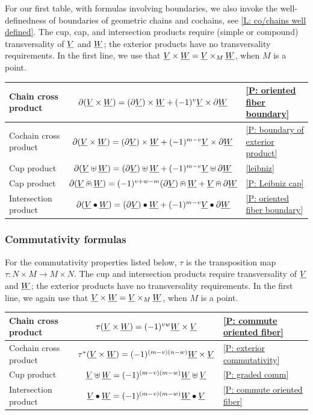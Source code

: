 For our first table, with formulas involving boundaries, we also invoke the well-definedness of boundaries of geometric chains and cochains, see \cref{L: co/chains well defined}.
The cup, cap, and intersection products require (simple or compound) transversality of $\underline{V}$ and $\underline{W}$; the exterior products have no transversality requirements.
In the first line, we use that $\underline{V} \times \underline{W} = \underline{V} \times_M \underline{W}$, when $M$ is a point.

\begin{center}
	\begin{tabular}{|l|c|l|}
		\hline
		Chain cross product &$\partial(\underline{V} \times \underline{W}) = (\partial \underline{V}) \times \underline{W}+ (-1)^{v}\underline{V} \times \partial \underline{W}$&\cref{P: oriented fiber boundary}\\
		\hline
		Cochain cross product&$\partial(\underline{V} \times \underline{W}) = (\partial \underline{V}) \times \underline{W}+ (-1)^{m-v}\underline{V} \times \partial \underline{W}$&\cref{P: boundary of exterior product}\\
		\hline
		Cup product&$\partial (\underline{V} \uplus \underline{W}) = (\partial \underline{V}) \uplus \underline{W}+ (-1)^{m-v} \underline{V} \uplus \partial \underline{W}$&\cref{leibniz}\\
		\hline
		Cap product&$\partial(\underline{V}\nplus \underline{W}) = (-1)^{v+w-m} (\partial \underline{V})\nplus \underline{W} + \underline{V}\nplus\partial \underline{W}$&\cref{P: Leibniz cap}\\
		\hline
		Intersection product &$\partial (\underline{V} \bullet \underline{W}) = (\partial \underline{V}) \bullet \underline{W} + (-1)^{m-v}\underline{V} \bullet \partial \underline{W}$&\cref{P: oriented fiber boundary}\\
		\hline
	\end{tabular}
\end{center}

\subsubsection{Commutativity formulas}

For the commutativity properties listed below, $\tau$ is the transposition map $\tau \colon N \times M \to M \times N$.
The cup and intersection products require transversality of $\underline{V}$ and $\underline{W}$; the exterior products have no transversality requirements.
In the first line, we again use that $\underline{V} \times \underline{W} = \underline{V} \times_M \underline{W}$, when $M$ is a point.

\begin{center}
	\begin{tabular}{|l|c|l|}
		\hline
		Chain cross product&$\tau(\underline{V} \times \underline{W}) = (-1)^{vw}\underline{W} \times \underline{V}$&\cref{P: commute oriented fiber}\\
		\hline
		Cochain cross product&$\tau^*(\underline{V} \times \underline{W}) = (-1)^{(m-v)(n-w)}\underline{W} \times \underline{V}$&\cref{P: exterior commutativity}\\
		\hline
		Cup product&$\underline{V}\uplus \underline{W} = (-1)^{(m-v)(m-w)} \underline{W}\uplus \underline{V}$&\cref{P: graded comm}\\
		\hline
		Intersection product&$\underline{V}\bullet \underline{W} = (-1)^{(m-v)(m-w)}\underline{W}\bullet \underline{V}$&\cref{P: commute oriented fiber}\\
		\hline
	\end{tabular}
\end{center}

